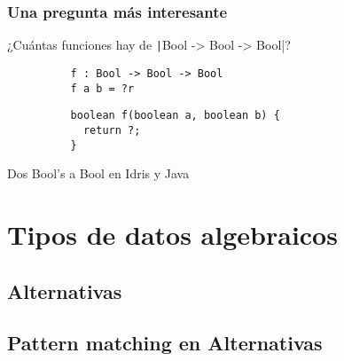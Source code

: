 \documentclass{beamer}
\begin{document}
\begin{frame}[fragile]
  \frametitle{Una pregunta más interesante}

  \large{¿Cuántas funciones hay de \texttt|Bool -> Bool -> Bool|?}
  \vspace{10pt}

  \begin{listing}[H]
    \begin{center}
      \begin{minipage}{0.45\textwidth}
          \begin{verbatim}
          f : Bool -> Bool -> Bool
          f a b = ?r

          \end{verbatim}
      \end{minipage}
      \hspace{-0.05\textwidth}
      \vrule
      \hspace{0.025\textwidth}
      \begin{minipage}{0.53\textwidth}
          \begin{verbatim}
          boolean f(boolean a, boolean b) {
            return ?;
          }
          \end{verbatim}
      \end{minipage}
    \end{center}
    \caption{Dos Bool's a Bool en Idris y Java}
    \label{lst:2boolIdrisJava}
  \end{listing}
\end{frame}

\section{Tipos de datos algebraicos}
\subsection{Alternativas}
\subsection{Pattern matching en Alternativas}
\end{document}
